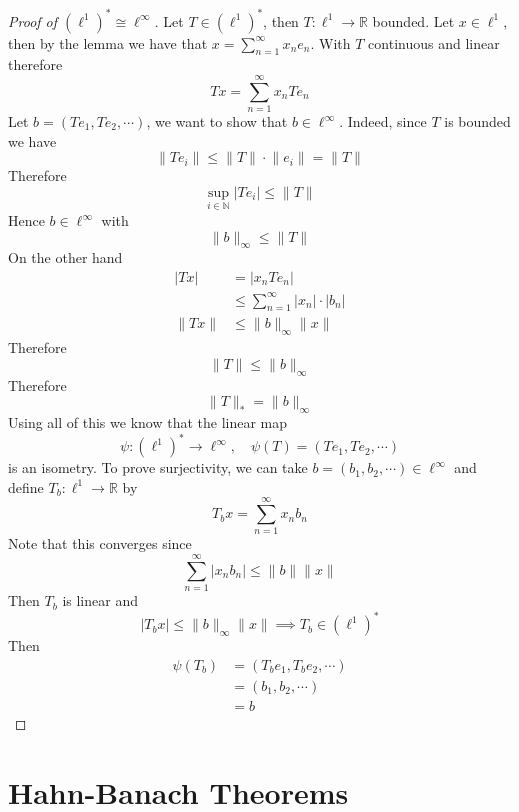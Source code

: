 \documentclass[11pt,a4paper]{article}
\theoremstyle{definition}
\theoremstyle{plain}
\theoremstyle{remark}
\newcommand{\R}{\mathbb{R}}
\newcommand{\N}{\mathbb{N}}
\newcommand{\abs}[1]{\lvert #1 \rvert}
\newcommand{\norm}[1]{\lVert #1 \rVert}
\newcommand{\1}{\mathbbm{1}}
\begin{document}
\begin{proof}[Proof of $(\ell^1)^* \cong \ell^\infty$]
    Let $T \in (\ell^1)^*$, then $T \colon \ell^1 \to \R$ bounded. Let $x \in \ell^1$, then by the lemma we have that $x = \sum_{n=1}^\infty x_n e_n$. With $T$ continuous and linear therefore 
    $$Tx = \sum_{n=1}^\infty x_n Te_n$$
    Let $b = (Te_1, Te_2, \cdots)$, we want to show that $b \in \ell^\infty$. Indeed, since $T$ is bounded we have 
    $$\norm{Te_i} \le \norm{T} \cdot \norm{e_i} = \norm{T}$$
    Therefore 
    $$\sup_{i \in \N} \abs{Te_i} \le \norm{T}$$
    Hence $b \in \ell^\infty$ with 
    $$\norm{b}_\infty \le \norm{T}$$
    On the other hand 
    \begin{align*}
        \abs{Tx} &= \abs{x_n Te_n} \\
        &\le \sum_{n=1}^\infty \abs{x_n} \cdot \abs{b_n} \\ 
        \norm{Tx} &\le \norm{b}_\infty \norm{x}
    \end{align*}
    Therefore 
    $$\norm{T} \le \norm{b}_\infty$$
    Therefore 
    $$\norm{T}_* = \norm{b}_\infty$$
    Using all of this we know that the linear map 
    $$\psi \colon (\ell^1)^* \to \ell^\infty, \quad \psi(T) = (Te_1, Te_2, \cdots)$$
    is an isometry. To prove surjectivity, we can take $b = (b_1, b_2, \cdots) \in \ell^\infty$ and define $T_b \colon \ell^1 \to \R$ by 
    $$T_b x = \sum_{n=1}^\infty x_n b_n$$
    Note that this converges since 
    $$\sum_{n=1}^\infty \abs{x_n b_n} \le \norm{b} \norm{x}$$
    Then $T_b$ is linear and
    $$\abs{T_bx} \le \norm{b}_\infty \norm{x} \implies T_b \in (\ell^1)^*$$
    Then 
    \begin{align*}
        \psi(T_b) &= (T_be_1, T_b e_2, \cdots) \\
        &= (b_1, b_2, \cdots) \\
        &= b
    \end{align*}
\end{proof}

\section{Hahn-Banach Theorems}
\end{document}
